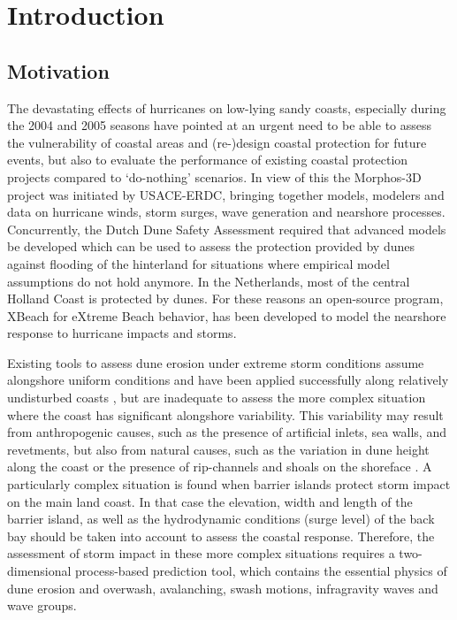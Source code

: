 \chapter{Introduction}

\section{Motivation}

The devastating effects of hurricanes on low-lying sandy coasts, especially during the 2004 and 2005 seasons have pointed at an urgent need to be able to assess the vulnerability of coastal areas and (re-)design coastal protection for future events, but also to evaluate the performance of existing coastal protection projects compared to `do-nothing' scenarios. In view of this the Morphos-3D project was initiated by USACE-ERDC, bringing together models, modelers and data on hurricane winds, storm surges, wave generation and nearshore processes. Concurrently, the Dutch Dune Safety Assessment required that advanced models be developed which can be used to assess the protection provided by dunes against flooding of the hinterland for situations where empirical model assumptions do not hold anymore. In the Netherlands, most of the central Holland Coast is protected by dunes. For these reasons an open-source program, XBeach for eXtreme Beach behavior, has been developed to model the nearshore response to hurricane impacts and storms. 

Existing tools to assess dune erosion under extreme storm conditions assume alongshore uniform conditions and have been applied successfully along relatively undisturbed coasts \citep{Vellinga1986, Steetzel1993, NishiKraus1996, Larson2004}, but are inadequate to assess the more complex situation where the coast has significant alongshore variability. This variability may result from anthropogenic causes, such as the presence of artificial inlets, sea walls, and revetments, but also from natural causes, such as the variation in dune height along the coast or the presence of rip-channels and shoals on the shoreface \citep{Thornton2007}. A particularly complex situation is found when barrier islands protect storm impact on the main land coast. In that case the elevation, width and length of the barrier island, as well as the hydrodynamic conditions (surge level) of the back bay should be taken into account to assess the coastal response. Therefore, the assessment of storm impact in these more complex situations requires a two-dimensional process-based prediction tool, which contains the essential physics of dune erosion and overwash, avalanching, swash motions, infragravity waves and wave groups. 

